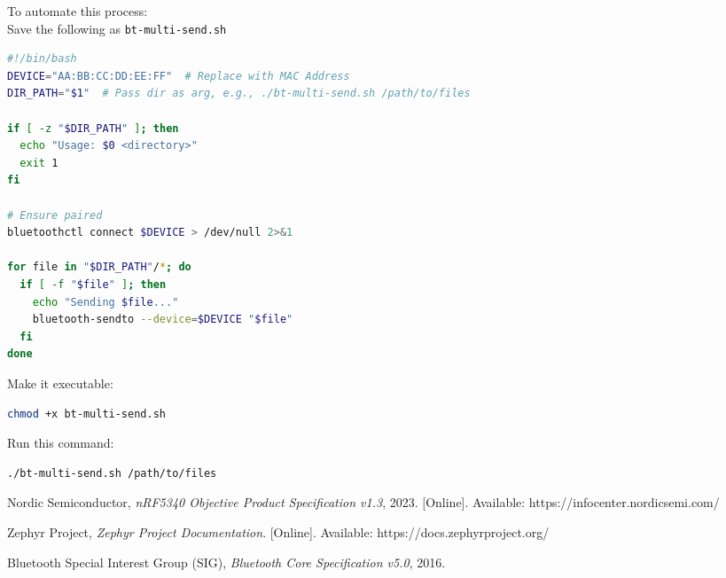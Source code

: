 \documentclass[conference]{IEEEtran}
\begin{document}
To automate this process: \\
Save the following as \texttt{bt-multi-send.sh}
\begin{lstlisting}[language=bash]
#!/bin/bash
DEVICE="AA:BB:CC:DD:EE:FF"  # Replace with MAC Address
DIR_PATH="$1"  # Pass dir as arg, e.g., ./bt-multi-send.sh /path/to/files

if [ -z "$DIR_PATH" ]; then
  echo "Usage: $0 <directory>"
  exit 1
fi

# Ensure paired
bluetoothctl connect $DEVICE > /dev/null 2>&1

for file in "$DIR_PATH"/*; do
  if [ -f "$file" ]; then
    echo "Sending $file..."
    bluetooth-sendto --device=$DEVICE "$file"
  fi
done
\end{lstlisting}

Make it executable:
\begin{lstlisting}[language=bash]
chmod +x bt-multi-send.sh
\end{lstlisting}

Run this command:
\begin{lstlisting}[language=bash]
./bt-multi-send.sh /path/to/files
\end{lstlisting}


\begin{thebibliography}{00}
Nordic Semiconductor, \emph{nRF5340 Objective Product Specification v1.3}, 2023. [Online]. Available: https://infocenter.nordicsemi.com/

Zephyr Project, \emph{Zephyr Project Documentation}. [Online]. Available: https://docs.zephyrproject.org/

Bluetooth Special Interest Group (SIG), \emph{Bluetooth Core Specification v5.0}, 2016.
\end{thebibliography}
\end{document}
